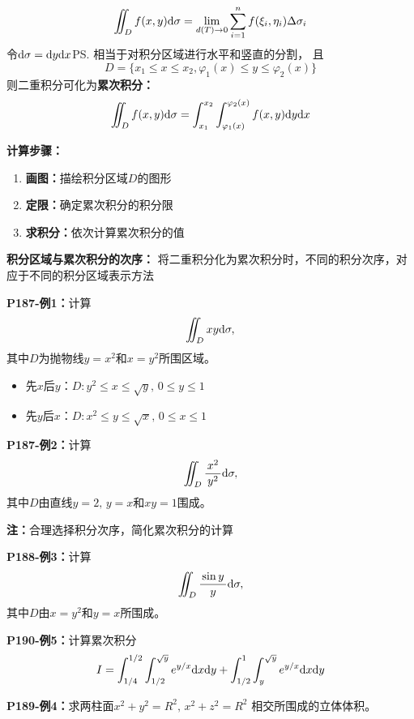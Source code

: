 $${\iint_Df(x,y)\mathrm{d}\sigma=\lim_{d(T)\to
  0}\sum_{i=1}^nf(\xi_i,\eta_i)\Delta\sigma_i}$$
 令$\mathrm{d}\sigma=\mathrm{d} y\mathrm{d} x$\ps{相当于对积分区域进行水平和竖直的分割}， 且
$$D=\{x_1\leq x\leq x_2,\varphi_1(x)\leq y\leq \varphi_2(x)\}$$
 则二重积分可化为{\bf 累次积分：}
$${\iint_Df(x,y)\mathrm{d}\sigma=\int_{x_1}^{x_2}
\int_{\varphi_1(x)}^{\varphi_2(x)}f(x,y)\mathrm{d} y\mathrm{d} x}$$

{\bf 计算步骤：}

\begin{enumerate}
  \setlength{\itemindent}{1cm}
  \item {\bf 画图：}描绘积分区域$D$的图形 
  \item {\bf 定限：}确定累次积分的积分限 
  \item {\bf 求积分：}依次计算累次积分的值 
\end{enumerate}

{\bf 积分区域与累次积分的次序：}
将二重积分化为累次积分时，不同的积分次序，对应于不同的积分区域表示方法

{\bf P187-例1：}计算
$$\iint_Dxy\mathrm{d}\sigma,$$
其中$D$为抛物线$y=x^2$和$x=y^2$所围区域。

\begin{itemize}
  \item {先$x$后$y$：}$D:y^2\leq x\leq\sqrt y,\,0\leq y\leq 1$ 
  \item {先$y$后$x$：}$D:x^2\leq y\leq\sqrt x,\,0\leq x\leq 1$
\end{itemize}

{\bf P187-例2：}计算
$$\iint_D\displaystyle\frac{\,{x^2}\,}{\,{y^2}\,}\mathrm{d}\sigma,$$
其中$D$由直线$y=2,\,y=x$和$xy=1$围成。

{\bf 注：}合理选择积分次序，简化累次积分的计算

{\bf P188-例3：}计算
$$\iint_D\displaystyle\frac{\,{\sin y}\,}{\,{y}\,}\mathrm{d}\sigma,$$
其中$D$由$x=y^2$和$y=x$所围成。

{\bf P190-例5：}计算累次积分
$$I=\int_{1/4}^{1/2}\int_{1/2}^{\sqrt y}e^{y/x}\mathrm{d} x\mathrm{d} y+
\int_{1/2}^1\int_y^{\sqrt y}e^{y/x}\mathrm{d} x\mathrm{d} y$$

{\bf P189-例4：}求两柱面$x^2+y^2=R^2,\, x^2+z^2=R^2$
相交所围成的立体体积。

